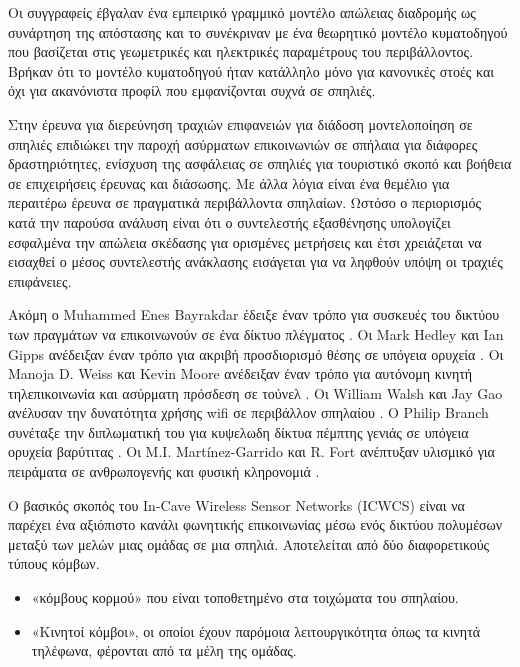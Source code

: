 \documentclass[12pt, greek]{article}
\begin{document}
\begin{multicols*}{2}
        Οι συγγραφείς έβγαλαν ένα εμπειρικό γραμμικό μοντέλο απώλειας διαδρομής ως συνάρτηση
        της απόστασης και το συνέκριναν με ένα θεωρητικό μοντέλο κυματοδηγού που βασίζεται στις
        γεωμετρικές και ηλεκτρικές παραμέτρους του περιβάλλοντος. Βρήκαν ότι το μοντέλο κυματοδηγού
        ήταν κατάλληλο μόνο για κανονικές στοές και όχι για ακανόνιστα προφίλ που εμφανίζονται
        συχνά σε σπηλιές.
        
        Στην έρευνα για διερεύνηση τραχιών επιφανειών για διάδοση μοντελοποίηση σε σπηλιές
        \cite{soo_investigation_2018} επιδιώκει την παροχή ασύρματων επικοινωνιών σε σπήλαια
        για διάφορες δραστηριότητες, ενίσχυση της ασφάλειας σε σπηλιές για τουριστικό σκοπό
        και βοήθεια σε επιχειρήσεις έρευνας και διάσωσης. Με άλλα λόγια είναι ένα θεμέλιο για
        περαιτέρω έρευνα σε πραγματικά περιβάλλοντα σπηλαίων. Ωστόσο ο περιορισμός κατά την
        παρούσα ανάλυση είναι ότι ο συντελεστής εξασθένησης υπολογίζει εσφαλμένα την απώλεια
        σκέδασης για ορισμένες μετρήσεις και έτσι χρειάζεται να εισαχθεί ο μέσος συντελεστής
        ανάκλασης εισάγεται για να ληφθούν υπόψη οι τραχιές επιφάνειες.

        Ακόμη ο Muhammed Enes Bayrakdar έδειξε έναν τρόπο για
        συσκευές του δικτύου των πραγμάτων να επικοινωνούν σε ένα δίκτυο πλέγματος
        \cite{bayrakdar_rule_2019}. Οι Mark Hedley και Ian Gipps ανέδειξαν έναν τρόπο για
        ακριβή προσδιορισμό θέσης σε υπόγεια ορυχεία \cite{hedley_accurate_2013}. Οι
        Manoja D. Weiss και Kevin Moore ανέδειξαν έναν τρόπο για αυτόνομη κινητή
        τηλεπικοινωνία και ασύρματη πρόσδεση σε τούνελ \cite{weiss_autonomous_2009}. Οι
        William Walsh και Jay Gao ανέλυσαν την δυνατότητα χρήσης wifi σε περιβάλλον
        σπηλαίου \cite{walsh_communications_2018}. Ο Philip Branch συνέταξε την
        διπλωματική του για κυψελωδη δίκτυα πέμπτης γενιάς σε υπόγεια ορυχεία βαρύτιτας
        \cite{branch_fifth_2021}. Οι M.I. Martínez-Garrido και R. Fort ανέπτυξαν υλισμικό
        για πειράματα σε ανθρωπογενής και φυσική κληρονομιά
        \cite{martinez-garrido_experimental_2016}.

        Ο βασικός σκοπός του In-Cave Wireless
        Sensor Networks (ICWCS) είναι να παρέχει ένα αξιόπιστο κανάλι φωνητικής επικοινωνίας
        μέσω ενός δικτύου πολυμέσων μεταξύ των μελών μιας ομάδας σε μια σπηλιά. Αποτελείται
        από δύο διαφορετικούς τύπους κόμβων. 
        \begin{itemize}
            \item «κόμβους κορμού» που είναι τοποθετημένο στα τοιχώματα του σπηλαίου.
            \item «Κινητοί κόμβοι», οι οποίοι έχουν παρόμοια λειτουργικότητα όπως τα κινητά
            τηλέφωνα, φέρονται από τα μέλη της ομάδας.
        \end{itemize}


\end{multicols*}
\end{document}
